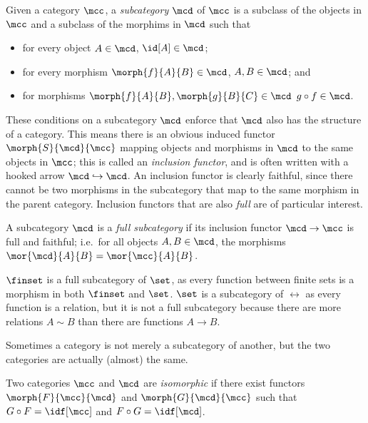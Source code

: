 \begin{definition}[Subcategory]
    Given a category \(\mcc\), a \emph{subcategory} \(\mcd\) of \(\mcc\) is a
    subclass of the objects in \(\mcc\) and a subclass of the morphims in
    \(\mcd\) such that
    \begin{itemize}
        \item for every object \(A \in \mcd\), \(\id[A] \in \mcd\);
        \item for every morphism \(\morph{f}{A}{B} \in \mcd\), \(A,B \in \mcd\);
              and
        \item for morphisms \(\morph{f}{A}{B}, \morph{g}{B}{C} \in \mcd\)
              \(g \circ f \in \mcd\).
    \end{itemize}
\end{definition}

These conditions on a subcategory \(\mcd\) enforce that \(\mcd\) also has the
structure of a category.
This means there is an obvious induced functor \(\morph{S}{\mcd}{\mcc}\) mapping
objects and morphisms in \(\mcd\) to the same objects in \(\mcc\); this is
called an \emph{inclusion functor}, and is often written with a hooked arrow
\(\mcd \hookrightarrow \mcd\).
An inclusion functor is clearly faithful, since there cannot be two morphisms in
the subcategory that map to the same morphism in the parent category.
Inclusion functors that are also \emph{full} are of particular interest.

\begin{definition}
    A subcategory \(\mcd\) is a \emph{full subcategory} if its inclusion functor
    \(\mcd \to \mcc\) is full and faithful; i.e.\ for all objects
    \(A, B \in \mcd\), the morphisms \(\mor{\mcd}{A}{B} = \mor{\mcc}{A}{B}\).
\end{definition}

\begin{example}
    \(\finset\) is a full subcategory of \(\set\), as every function between
    finite sets is a morphism in both \(\finset\) and \(\set\).
    \(\set\) is a subcategory of \(\rel\) as every function is a relation, but
    it is not a full subcategory because there are more relations \(A \sim B\)
    than there are functions \(A \to B\).
\end{example}

Sometimes a category is not merely a subcategory of another, but the two
categories are actually (almost) the same.

\begin{definition}
    Two categories \(\mcc\) and \(\mcd\) are \emph{isomorphic} if there exist
    functors \(\morph{F}{\mcc}{\mcd}\) and \(\morph{G}{\mcd}{\mcc}\) such that
    \(G \circ F = \idf[\mcc]\) and \(F \circ G = \idf[\mcd]\).
\end{definition}

